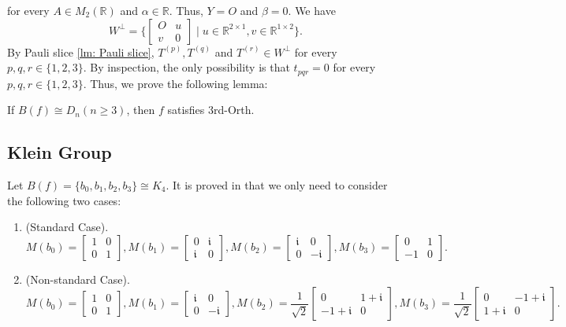 for every $A\in M_{2}(\mathbb{R})$ and $\alpha\in \mathbb{R}.$
Thus, $Y=O$ and $\beta=0.$
We have 
$$
W^{\perp}=\{\left[\begin{matrix}
    O & u\\
    v & 0
\end{matrix}\right]\mid u\in \mathbb{R}^{2\times 1}, v\in \mathbb{R}^{1\times 2}\}.
$$
By Pauli slice \cref{lm: Pauli slice}, $T^{(p)},T^{(q)}$ and $T^{(r)}\in W^\perp$ for every $p,q,r\in\{1,2,3\}.$
By inspection, the only possibility is that $t_{pqr}=0$ for every $p,q,r\in\{1,2,3\}.$
Thus, we prove the following lemma:
\begin{lemma}\label{lm: arity 6 dihedral group 3rd orth}
    If $B(f)\cong D_{n}(n\ge 3)$, then $f$ satisfies {\sc 3rd-Orth}.
\end{lemma}


\subsection{Klein Group}\label{subsec: Klein group}
Let $B(f)=\{b_0,b_1,b_2,b_3\}\cong K_4$.
It is proved in \cite{MingjiProgram} that we only need to consider the following two cases:
\begin{enumerate}
    \item
    (Standard Case).
    $$
    M(b_0)=\left[\begin{matrix}
    1 & 0\\
    0 & 1
    \end{matrix}\right],
    M(b_1)=\left[\begin{matrix}
    0 & \mathfrak{i}\\
    \mathfrak{i} & 0
    \end{matrix}\right],
    M(b_2)=\left[\begin{matrix}
    \mathfrak{i} & 0\\
    0 & -\mathfrak{i}
    \end{matrix}\right],
    M(b_3)=\left[\begin{matrix}
    0 & 1\\
    -1 & 0
    \end{matrix}\right].$$
        
    \item
    (Non-standard Case).
    $$M(b_0)=\left[\begin{matrix}
    1 & 0\\
    0 & 1
    \end{matrix}\right],
    M(b_1)=\left[\begin{matrix}
    \mathfrak{i} & 0\\
    0 & -\mathfrak{i}
    \end{matrix}\right],
    M(b_2)=\frac{1}{\sqrt{2}}\left[\begin{matrix}
    0 & 1+\mathfrak{i}\\
    -1+\mathfrak{i} & 0
    \end{matrix}\right],
    M(b_3)=\frac{1}{\sqrt{2}}\left[\begin{matrix}
    0 & -1+\mathfrak{i}\\
    1+\mathfrak{i} & 0
    \end{matrix}\right].$$
\end{enumerate}

